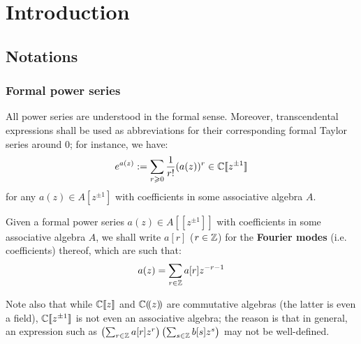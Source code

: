 \section{Introduction}
    \subsection{Notations}
        \subsubsection{Formal power series}
            All power series are understood in the formal sense. Moreover, transcendental expressions shall be used as abbreviations for their corresponding formal Taylor series around $0$; for instance, we have:
                $$e^{a(z)} := \sum_{r \geqslant 0} \frac{1}{r!} ( a(z) )^r \in \mathbb{C}[\![z^{\pm 1}]\!]$$
            for any $a(z) \in A[z^{\pm 1}]$ with coefficients in some associative algebra $A$.

            Given a formal power series $a(z) \in A[\![z^{\pm 1}]\!]$ with coefficients in some associative algebra $A$, we shall write $a[r]$ ($r \in \mathbb{Z}$) for the \textbf{Fourier modes} (i.e. coefficients) thereof, which are such that:
                $$a(z) = \sum_{r \in \mathbb{Z}} a[r] z^{-r - 1}$$
            
            Note also that while $\mathbb{C}[\![z]\!]$ and $\mathbb{C}(\!(z)\!)$ are commutative algebras (the latter is even a field), $\mathbb{C}[\![z^{\pm 1}]\!]$ is not even an associative algebra; the reason is that in general, an expression such as $\left( \sum_{r \in \mathbb{Z}} a[r] z^r \right) \left( \sum_{s \in \mathbb{Z}} b[s] z^s \right)$ may not be well-defined.
    
